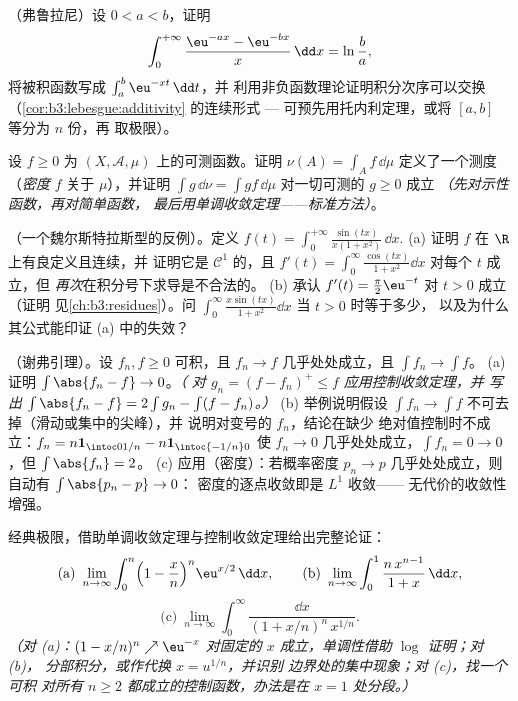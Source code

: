 \begin{exercise}[$\star\star\star$]\label{exo:b3:lebesgue:8}
（弗鲁拉尼）设 $0 < a < b$，证明
\[
\int_0^{+\infty}\frac{\eu^{-ax} - \eu^{-bx}}{x}\,\dd x =
\ln\frac ba,
\]
将被积函数写成 $\int_a^b \eu^{-xt}\,\dd t$，并
利用非负函数理论证明积分次序可以交换
（\cref{cor:b3:lebesgue:additivity} 的连续形式 ---
可预先用托内利定理，或将 $[a,b]$ 等分为 $n$ 份，再
取极限）。
\end{exercise}

\begin{exercise}[$\star\star$]\label{exo:b3:lebesgue:9}
设 $f \geq 0$ 为 $(X, \mathcal A, \mu)$ 上的可测函数。证明
$\nu(A) = \int_A f\,\dd\mu$ 定义了一个测度
（\emph{密度} $f$ 关于
$\mu$），并证明 $\int g\,\dd\nu = \int gf\,\dd\mu$
对一切可测的 $g \geq 0$ 成立 \emph{（先对示性函数，再对简单函数，
最后用单调收敛定理——标准方法）}。
\end{exercise}

\begin{exercise}[$\star\star\star$]\label{exo:b3:lebesgue:10}
（一个魏尔斯特拉斯型的反例）。定义 $f(t) =
\int_0^{+\infty}\frac{\sin(tx)}{x(1 + x^2)}\,\dd x$.
(a) 证明 $f$ 在 $\R$ 上有良定义且连续，并
证明它是 $\mathcal C^1$ 的，且 $f'(t) = \int_0^\infty\frac{\cos(tx)}{1 +
x^2}\dd x$ 对每个 $t$ 成立，但
\emph{再次}在积分号下求导是不合法的。
(b) 承认 $f'(t) = \frac\pi2\eu^{-t}$ 对 $t > 0$ 成立（证明
见\cref{ch:b3:residues}）。问
$\int_0^\infty\frac{x\sin(tx)}{1+x^2}\dd x$ 当 $t > 0$ 时等于多少，
以及为什么其公式能印证 (a) 中的失效？
\end{exercise}

\begin{exercise}[$\star\star$]\label{exo:b3:lebesgue:11}
（谢弗引理）。设 $f_n, f \geq 0$ 可积，且
$f_n \to f$ 几乎处处成立，且 $\int f_n \to \int f$。
(a) 证明 $\int\abs{f_n - f} \to 0$。\emph{（
对 $g_n = (f - f_n)^+ \leq f$ 应用控制收敛定理，并
写出 $\int\abs{f_n - f} = 2\int g_n - \int(f - f_n)$。）}
(b) 举例说明假设 $\int f_n \to \int
f$ 不可去掉（滑动或集中的尖峰），并
说明对变号的 $f_n$，结论在缺少
绝对值控制时不成立：$f_n = n\mathbf 1_{\intoc0{1/n}} -
n\mathbf 1_{\intoc{-1/n}0}$ 使 $f_n \to 0$ 几乎处处成立，$\int f_n
= 0 \to 0$，但 $\int\abs{f_n} = 2$。
(c) 应用（密度）：若概率密度 $p_n
\to p$ 几乎处处成立，则自动有 $\int\abs{p_n - p} \to 0$：
密度的逐点收敛即是 $L^1$ 收敛——
无代价的收敛性增强。
\end{exercise}

\begin{exercise}[$\star\star$]\label{exo:b3:lebesgue:12}
经典极限，借助单调收敛定理与控制收敛定理给出完整论证：
\[
\text{(a)}\ \lim_{n\to\infty}\int_0^n\Bigl(1 -
\frac xn\Bigr)^n\eu^{x/2}\,\dd x, \qquad
\text{(b)}\ \lim_{n\to\infty}\int_0^1\frac{n\,x^{n-1}}{1 +
x}\,\dd x,
\]
\[
\text{(c)}\ \lim_{n\to\infty}\int_0^\infty
\frac{\dd x}{(1 + x/n)^n\,x^{1/n}} .
\]
\emph{（对 (a)：$(1 - x/n)^n \nearrow \eu^{-x}$ 对固定的
$x$ 成立，单调性借助 $\log$ 证明；对 (b)，
分部积分，或作代换 $x = u^{1/n}$，并识别
边界处的集中现象；对 (c)，找一个可积
对所有 $n \geq 2$ 都成立的控制函数，办法是在 $x =
1$ 处分段。）}
\end{exercise}

